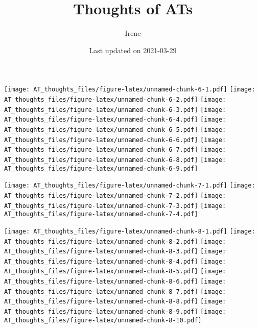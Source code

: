 \documentclass[
]{article}
\title{Thoughts of ATs}
\author{Irene}
\date{Last updated on 2021-03-29}
\begin{document}
\maketitle

\texttt{[image: AT\_thoughts\_files/figure-latex/unnamed-chunk-6-1.pdf]}
\texttt{[image: AT\_thoughts\_files/figure-latex/unnamed-chunk-6-2.pdf]}
\texttt{[image: AT\_thoughts\_files/figure-latex/unnamed-chunk-6-3.pdf]}
\texttt{[image: AT\_thoughts\_files/figure-latex/unnamed-chunk-6-4.pdf]}
\texttt{[image: AT\_thoughts\_files/figure-latex/unnamed-chunk-6-5.pdf]}
\texttt{[image: AT\_thoughts\_files/figure-latex/unnamed-chunk-6-6.pdf]}
\texttt{[image: AT\_thoughts\_files/figure-latex/unnamed-chunk-6-7.pdf]}
\texttt{[image: AT\_thoughts\_files/figure-latex/unnamed-chunk-6-8.pdf]}
\texttt{[image: AT\_thoughts\_files/figure-latex/unnamed-chunk-6-9.pdf]}

\texttt{[image: AT\_thoughts\_files/figure-latex/unnamed-chunk-7-1.pdf]}
\texttt{[image: AT\_thoughts\_files/figure-latex/unnamed-chunk-7-2.pdf]}
\texttt{[image: AT\_thoughts\_files/figure-latex/unnamed-chunk-7-3.pdf]}
\texttt{[image: AT\_thoughts\_files/figure-latex/unnamed-chunk-7-4.pdf]}

\texttt{[image: AT\_thoughts\_files/figure-latex/unnamed-chunk-8-1.pdf]}
\texttt{[image: AT\_thoughts\_files/figure-latex/unnamed-chunk-8-2.pdf]}
\texttt{[image: AT\_thoughts\_files/figure-latex/unnamed-chunk-8-3.pdf]}
\texttt{[image: AT\_thoughts\_files/figure-latex/unnamed-chunk-8-4.pdf]}
\texttt{[image: AT\_thoughts\_files/figure-latex/unnamed-chunk-8-5.pdf]}
\texttt{[image: AT\_thoughts\_files/figure-latex/unnamed-chunk-8-6.pdf]}
\texttt{[image: AT\_thoughts\_files/figure-latex/unnamed-chunk-8-7.pdf]}
\texttt{[image: AT\_thoughts\_files/figure-latex/unnamed-chunk-8-8.pdf]}
\texttt{[image: AT\_thoughts\_files/figure-latex/unnamed-chunk-8-9.pdf]}
\texttt{[image: AT\_thoughts\_files/figure-latex/unnamed-chunk-8-10.pdf]}
\end{document}
